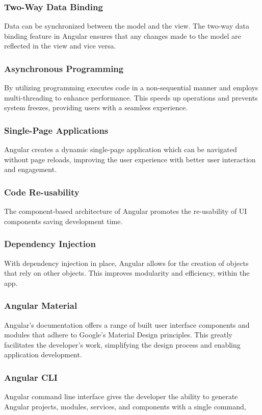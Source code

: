 \subsubsection{Two-Way Data Binding}
Data can be synchronized between the model and the view. The two-way data binding feature in Angular ensures that any changes made to the model are reflected 
in the view and vice versa. 

\subsubsection{Asynchronous Programming}
By utilizing programming executes code in a non-sequential manner and employs multi-threading to enhance performance. This speeds up operations and prevents system freezes, providing users with a seamless experience.

\subsubsection{Single-Page Applications}
Angular creates a dynamic single-page application which can be navigated without page reloads, improving the user experience with better user interaction and engagement.

\subsubsection {Code Re-usability}
The component-based architecture of Angular promotes the re-usability of UI components saving development time.

\subsubsection{Dependency Injection}
With dependency injection in place, Angular allows for the creation of objects that rely on other objects. This improves modularity and efficiency, within the app.

\subsubsection{Angular Material}
Angular's documentation offers a range of built user interface components and modules that adhere to Google's Material Design principles. This greatly facilitates the developer's work, simplifying the design process and enabling application development.

\subsubsection{Angular CLI} Angular command line interface gives the developer the ability to generate Angular projects, modules, services, and components with a single command, 

